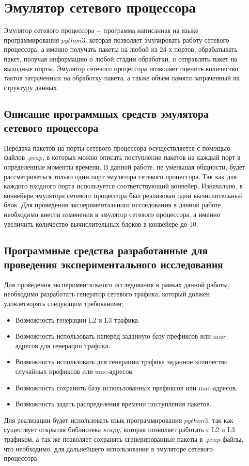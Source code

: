 \documentclass[a4paper, 12pt, titlepage, finall]{extreport}
\begin{document}
    \chapter{Эмулятор сетевого процессора}
        Эмулятор сетевого процессора $-$ программа написанная на языке программирования $python3$, которая позволяет эмулировать работу сетевого процессора, 
        а именно получать пакеты на любой из 24-х портов, обрабатывать пакет, получая информацию о любой стадии обработки, и отправлять пакет на выходные порты.
        Эмулятор сетевого процессора позволяет оценить количество тактов затраченных на обработку пакета, а также объём памяти затраченный на структуру данных.

        \section{Описание программных средств эмулятора сетевого процессора}
            Передача пакетов на порты сетевого процессора осуществляется с помощью файлов $.pcap$, в которых можно описать поступление пакетов на каждый порт в определённые моменты времени.
            В данной работе, не уменьшая общности, будет рассматриваться только один порт эмулятора сетевого процессора. Так как для каждого входного
            порта используется соответствующий конвейер. Изначально, в конвейере эмулятора сетевого процессора был реализован один вычислительный блок.
            Для проведения экспериментального исследования в данной работе, необходимо внести изменения в эмулятор сетевого процессора, а именно увеличить количество вычислительных блоков 
            в конвейере до 10.
        \section{Программные средства разработанные для проведения экспериментального исследования}
            Для проведения экспериментального исследования в рамках данной работы, необходимо разработать генератор сетевого трафика, который должен удовлетворять следующим требованиям:
            \begin{itemize}
                \item Возможность генерации L2 и L3 трафика.
                \item Возможность использовать наперёд заданную базу префиксов или mac-адресов для генерации трафика.
                \item Возможность использовать для генерации трафика заданное количество случайных префиксов или mac-адресов.
                \item Возможность сохранить базу использованных префиксов или mac-адресов.
                \item Возможность задать распределения времени поступления пакетов.
            \end{itemize}
            Для реализации будет использовать язык программирования $python3$, так как существует открытая библиотека $scapy$, которая позволяет работать с L2 и L3 трафиком,
            а так же позволяет сохранять сгенерированные пакеты в $.pcap$ файлы, что необходимо, для дальнейшего использования в эмуляторе сетевого процессора.
\end{document}
